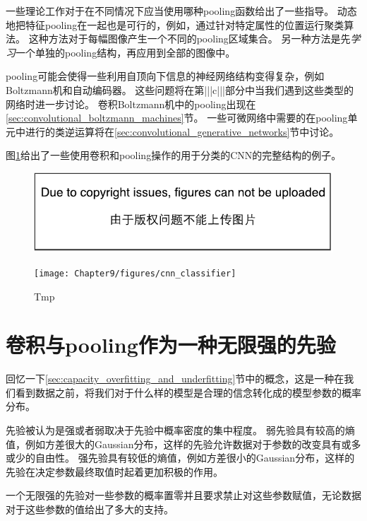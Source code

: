 一些理论工作对于在不同情况下应当使用哪种\gls{pooling}函数给出了一些指导\citep{boureau-icml-10}。
动态地把特征\gls{pooling}在一起也是可行的，例如，通过针对特定属性的位置运行聚类算法\citep{boureau-iccv-11}。
这种方法对于每幅图像产生一个不同的\gls{pooling}区域集合。
另一种方法是先\emph{学习}一个单独的\gls{pooling}结构，再应用到全部的图像中\citep{jia2012beyond}。

\gls{pooling}可能会使得一些利用自顶向下信息的神经网络结构变得复杂，例如Boltzmann机和自动编码器。
这些问题将在第|||c|||部分中当我们遇到这些类型的网络时进一步讨论。
卷积Boltzmann机中的\gls{pooling}出现在\ref{sec:convolutional_boltzmann_machines}节。
一些可微网络中需要的在\gls{pooling}单元中进行的类逆运算将在\ref{sec:convolutional_generative_networks}节中讨论。

图\ref{fig:chap9_cnn_classifier}给出了一些使用卷积和\gls{pooling}操作的用于分类的\gls{CNN}的完整结构的例子。
\begin{figure}[!htb]
\ifOpenSource
\centerline{\includegraphics{figure.pdf}}
\else
\centerline{\texttt{[image: Chapter9/figures/cnn\_classifier]}}
\fi
\caption{Tmp}
\label{fig:chap9_cnn_classifier}
\end{figure}

\section{卷积与\gls{pooling}作为一种无限强的先验}
\label{sec:convolution_and_pooling_as_an_infinitely_strong_prior}

回忆一下\ref{sec:capacity_overfitting_and_underfitting}节中的概念，这是一种在我们看到数据之前，将我们对于什么样的模型是合理的信念转化成的模型参数的概率分布。

 
先验被认为是强或者弱取决于先验中概率密度的集中程度。
弱先验具有较高的熵值，例如方差很大的Gaussian分布，这样的先验允许数据对于参数的改变具有或多或少的自由性。
强先验具有较低的熵值，例如方差很小的Gaussian分布，这样的先验在决定参数最终取值时起着更加积极的作用。

一个无限强的先验对一些参数的概率置零并且要求禁止对这些参数赋值，无论数据对于这些参数的值给出了多大的支持。

